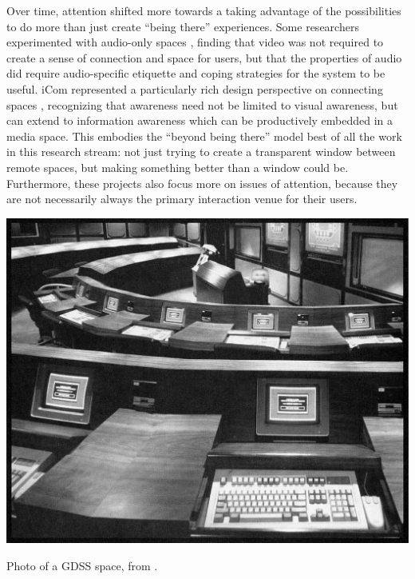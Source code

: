 \documentclass{tufte-handout}
\begin{document}
Over time, attention shifted more towards a taking advantage of the possibilities to do more than just create ``being there'' experiences. Some researchers experimented with audio-only spaces \citep{Hindus:1996cn}, finding that video was not required to create a sense of connection and space for users, but that the properties of audio did require audio-specific etiquette and coping strategies for the system to be useful. iCom represented a particularly rich design perspective on connecting spaces  \citep{Agamanolis:2003wc}, recognizing that awareness need not be limited to visual awareness, but can extend to information awareness which can be productively embedded in a media space. This embodies the ``beyond being there'' model best of all the work in this research stream: not just trying to create a transparent window between remote spaces, but making something better than a window could be. Furthermore, these projects also focus more on issues of attention, because they are not necessarily always the primary interaction venue for their users. 



\begin{marginfigure}
	\includegraphics{figures/nunamaker_gdss.png}
	\caption{Photo of a GDSS space, from \citep{nunamaker_electronic_1991}.}
	\label{fig:gdss}
\end{marginfigure}
\end{document}
